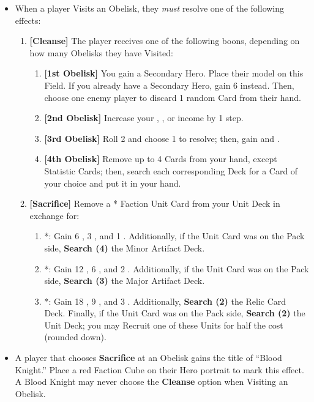 \begin{multicols*}{2}
\begin{itemize}
  \item When a player Visits an Obelisk, they \textit{must} resolve one of the following effects:
  \begin{enumerate}[leftmargin=15pt]
    \item \textbf{[Cleanse]} The player receives one of the following boons, depending on how many Obelisks they have Visited:
    \begin{enumerate}
      \item \textbf{[1st Obelisk]} You gain a Secondary Hero. Place their model on this Field. If you already have a Secondary Hero, gain 6  instead. Then, choose one enemy player to discard 1 random Card from their hand.
      \item \textbf{[2nd Obelisk]} Increase your , , or  income by 1 step.
      \item \textbf{[3rd Obelisk]} Roll 2  and choose 1 to resolve; then, gain  and .
      \item \textbf{[4th Obelisk]} Remove up to 4 Cards from your hand, except Statistic Cards; then, search each corresponding Deck for a Card of your choice and put it in your hand.
    \end{enumerate}
    \item \textbf{[Sacrifice]} Remove a * Faction Unit Card from your Unit Deck in exchange for:
    \begin{enumerate}
      \item *: Gain 6 , 3 , and 1 . Additionally, if the Unit Card was on the Pack side, \textbf{Search (4)} the Minor Artifact Deck.
      \item *: Gain 12 , 6 , and 2 . Additionally, if the Unit Card was on the Pack side, \textbf{Search (3)} the Major Artifact Deck.
      \item *: Gain 18 , 9 , and 3 . Additionally, \textbf{Search (2)} the Relic Card Deck. Finally, if the Unit Card was on the Pack side, \textbf{Search (2)} the  Unit Deck; you may Recruit one of these Units for half the cost (rounded down).
    \end{enumerate}
  \end{enumerate}
  \item A player that chooses \textbf{Sacrifice} at an Obelisk gains the title of ``\textcolor{darkcandyapplered}{Blood Knight}.'' Place a red Faction Cube on their Hero portrait to mark this effect. A \textcolor{darkcandyapplered}{Blood Knight} may never choose the \textbf{Cleanse} option when Visiting an Obelisk.

\end{itemize}
\end{multicols*}
